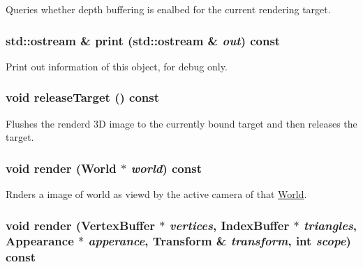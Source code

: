 Queries whether depth buffering is enalbed for the current rendering target. \hypertarget{classm3g_1_1Graphics3D_6fea17fa1532df3794f8cb39cb4f911f}{
\subsubsection[{print}]{\setlength{\rightskip}{0pt plus 5cm}std::ostream \& print (std::ostream \& {\em out}) const}}
\label{classm3g_1_1Graphics3D_6fea17fa1532df3794f8cb39cb4f911f}


Print out information of this object, for debug only. \hypertarget{classm3g_1_1Graphics3D_3ffaaf0d0f1e97a07c7f30c9b5a5dd32}{
\subsubsection[{releaseTarget}]{\setlength{\rightskip}{0pt plus 5cm}void releaseTarget () const}}
\label{classm3g_1_1Graphics3D_3ffaaf0d0f1e97a07c7f30c9b5a5dd32}


Flushes the renderd 3D image to the currently bound target and then releases the target. \hypertarget{classm3g_1_1Graphics3D_8ef004c92d601203b8c697d441e7713f}{
\subsubsection[{render}]{\setlength{\rightskip}{0pt plus 5cm}void render ({\bf World} $\ast$ {\em world}) const}}
\label{classm3g_1_1Graphics3D_8ef004c92d601203b8c697d441e7713f}


Rnders a image of world as viewd by the active camera of that \hyperlink{classm3g_1_1World}{World}. \hypertarget{classm3g_1_1Graphics3D_9179d0d886a57cd3234b34f1b59dfc3c}{
\subsubsection[{render}]{\setlength{\rightskip}{0pt plus 5cm}void render ({\bf VertexBuffer} $\ast$ {\em vertices}, \/  {\bf IndexBuffer} $\ast$ {\em triangles}, \/  {\bf Appearance} $\ast$ {\em apperance}, \/  {\bf Transform} \& {\em transform}, \/  int {\em scope}) const}}
\label{classm3g_1_1Graphics3D_9179d0d886a57cd3234b34f1b59dfc3c}


